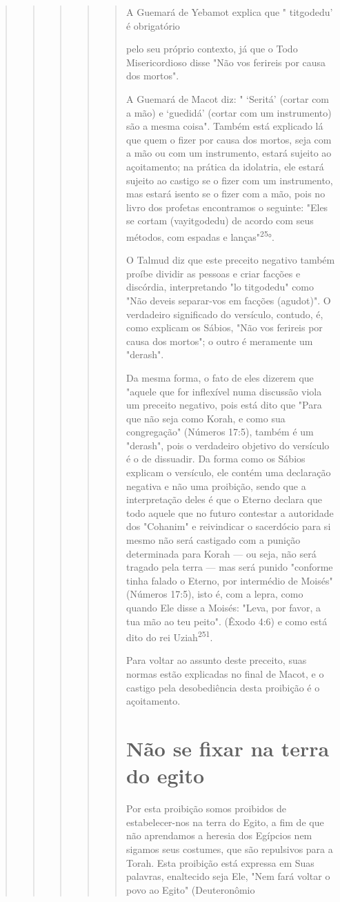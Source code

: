 \begin{quote}
\begin{quote}
\begin{quote}
\begin{quote}
\begin{quote}
A Guemará de Yebamot explica que " titgodedu' é obrigatório

pelo seu próprio contexto, já que o Todo Misericordioso disse "Não vos
feri­reis por causa dos mortos".

A Guemará de Macot diz: " `Seritá' (cortar com a mão) e `guedidá'
(cortar com um instrumento) são a mesma coisa". Também está explicado lá
que quem o fizer por causa dos mortos, seja com a mão ou com um
instrumen­to, estará sujeito ao açoitamento; na prática da idolatria,
ele estará sujeito ao castigo se o fizer com um instrumento, mas estará
isento se o fizer com a mão, pois no livro dos profetas encontramos o
seguinte: "Eles se cortam (vayitgode­du) de acordo com seus métodos, com
espadas e lanças"\textsuperscript{25}°.

O Talmud diz que este preceito negativo também proíbe dividir as pessoas
e criar facções e discórdia, interpretando "lo titgodedu" como "Não
deveis separar-vos em facções (agudot)". O verdadeiro significado do
versícu­lo, contudo, é, como explicam os Sábios, "Não vos ferireis por
causa dos mor­tos"; o outro é meramente um "derash".

Da mesma forma, o fato de eles dizerem que "aquele que for inflexí­vel
numa discussão viola um preceito negativo, pois está dito que "Para que
não seja como Korah, e como sua congregação" (Números 17:5), também é um
"derash", pois o verdadeiro objetivo do versículo é o de dissuadir. Da
forma como os Sábios explicam o versículo, ele contém uma declaração
negativa e não uma proibição, sendo que a interpretação deles é que o
Eterno declara que todo aquele que no futuro contestar a autoridade dos
"Cohanim" e reivindicar o sacerdócio para si mesmo não será castigado
com a punição determinada pa­ra Korah --- ou seja, não será tragado pela
terra --- mas será punido "conforme tinha falado o Eterno, por
intermédio de Moisés" (Números 17:5), isto é, com a lepra, como quando
Ele disse a Moisés: "Leva, por favor, a tua mão ao teu peito". (Êxodo
4:6) e como está dito do rei Uziah\textsuperscript{251}.

Para voltar ao assunto deste preceito, suas normas estão explicadas no
final de Macot, e o castigo pela desobediência desta proibição é o
açoitamento.

\section{Não se fixar na terra do egito}

Por esta proibição somos proibidos de estabelecer-nos na terra do Egito,
a fim de que não aprendamos a heresia dos Egípcios nem sigamos seus
costumes, que são repulsivos para a Torah. Esta proibição está expressa
em Suas palavras, enaltecido seja Ele, "Nem fará voltar o povo ao Egito"
(Deuteronômio
\end{quote}


\end{quote}
\end{quote}
\end{quote}
\end{quote}
